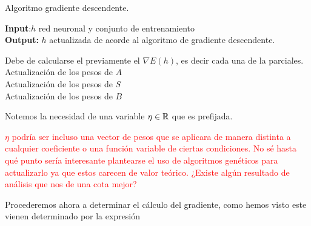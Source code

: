 \begin{algorithm}[H]
    \caption{Algoritmo gradiente descendente.}
    \hspace*{\algorithmicindent} \textbf{Input}:$h$ red neuronal  y conjunto de entrenamiento \\
    \hspace*{\algorithmicindent} \textbf{Output:} $h$ actualizada de acorde al algoritmo de gradiente descendente. 
    \begin{algorithmic}[1]
        \STATE Debe de calcularse el previamente el $\nabla E(h)$, es decir cada una de la parciales.
        \STATE Actualización de los pesos de $A$ \\  
        \STATE Actualización de los pesos de $S$ \\   
        \STATE Actualización de los pesos de $B$ \\ 
\end{algorithmic}
\end{algorithm}

Notemos la necesidad de una variable $\eta \in \mathbb{R}$ que es prefijada. 

\textcolor{red}{$\eta$ podría ser incluso una vector de pesos que se aplicara de manera distinta a cualquier coeficiente o una función variable de ciertas condiciones. No sé hasta qué punto sería interesante plantearse el uso de algoritmos genéticos para actualizarlo ya que estos carecen de valor teórico. ¿Existe algún resultado de análisis que nos de una cota mejor?}


Procederemos ahora a determinar el cálculo del gradiente, como hemos visto este vienen determinado por la expresión 




